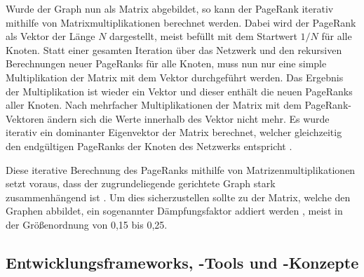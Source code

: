 Wurde der Graph nun als Matrix abgebildet, so kann der PageRank iterativ mithilfe von Matrixmultiplikationen berechnet werden. Dabei wird der PageRank als Vektor der Länge $N$ dargestellt, meist befüllt mit dem Startwert $1/N$ für alle Knoten. Statt einer gesamten Iteration über das Netzwerk und den rekursiven Berechnungen neuer PageRanks für alle Knoten, muss nun nur eine simple Multiplikation der Matrix mit dem Vektor durchgeführt werden. Das Ergebnis der Multiplikation ist wieder ein Vektor und dieser enthält die neuen PageRanks aller Knoten. Nach mehrfacher Multiplikationen der Matrix mit dem PageRank-Vektoren ändern sich die Werte innerhalb des Vektor nicht mehr. Es wurde iterativ ein dominanter Eigenvektor der Matrix berechnet, welcher gleichzeitig den endgültigen PageRanks der Knoten des Netzwerks entspricht \cite{pagerank_eigenvector}. 

Diese iterative Berechnung des PageRanks mithilfe von Matrizenmultiplikationen setzt voraus, dass der zugrundeliegende gerichtete Graph stark zusammenhängend ist \cite{pagerank_eigenvector}. Um dies sicherzustellen sollte zu der Matrix, welche den Graphen abbildet, ein sogenannter Dämpfungsfaktor addiert werden \cite{pagerank_eigenvector}, meist in der Größenordnung von 0,15 bis 0,25. 

\subsection{Entwicklungsframeworks, -Tools und -Konzepte}